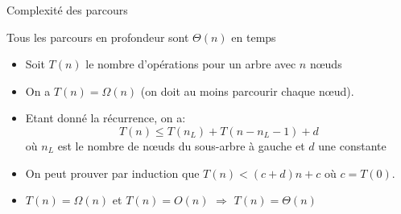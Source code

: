 \begin{frame}{Complexité des parcours}


Tous les parcours en profondeur sont $\Theta(n)$ en temps
\begin{itemize}
\item Soit $T(n)$ le nombre d'opérations pour un arbre avec $n$ n\oe uds
\item On a $T(n)=\Omega(n)$ (on doit au moins parcourir chaque n\oe ud).
\item Etant donné la récurrence, on a:
$$T(n)\leq T(n_L)+T(n-n_L-1) + d$$ où $n_L$ est le nombre de n\oe uds du sous-arbre à gauche et $d$ une constante
\item On peut prouver par induction que $T(n)< (c+d) n +c$ où $c=T(0)$.
\item $T(n)=\Omega(n)$ et $T(n)=O(n)$ $\Rightarrow$ $T(n)=\Theta(n)$
\end{itemize}

\end{frame}

